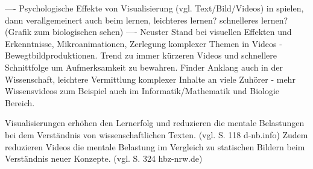 ---- Psychologische Effekte von Visualisierung (vgl. Text/Bild/Videos) in spielen, dann verallgemeinert auch beim lernen, leichteres lernen? schnelleres lernen? (Grafik zum biologischen sehen) 
---- Neuster Stand bei visuellen Effekten und Erkenntnisse, Mikroanimationen, Zerlegung komplexer Themen in Videos - Bewegtbildproduktionen. Trend zu immer kürzeren Videos und schnellere Schnittfolge um Aufmerksamkeit zu bewahren. Finder Anklang auch in der Wissenschaft, leichtere Vermittlung komplexer Inhalte an viele Zuhörer - mehr Wissensvideos zum Beispiel auch im Informatik/Mathematik und Biologie Bereich. 

Visualisierungen erhöhen den Lernerfolg und reduzieren die mentale Belastungen bei dem Verständnis von wissenschaftlichen Texten. (vgl. S. 118 d-nb.info)
Zudem reduzieren Videos die mentale Belastung im Vergleich zu statischen Bildern beim Verständnis neuer Konzepte. (vgl. S. 324 hbz-nrw.de)


